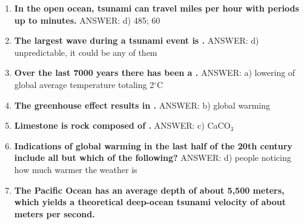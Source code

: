 \documentclass[10pt]{article}
\newcommand{\Rivpt}{\rule{.1pt}{1pt}}
\begin{document}
\begin{enumerate}
\item {
\setlength{\itemsep}{0cm}
\setlength{\parskip}{.2cm}
\begin{samepage}
\textbf{
In the open ocean, tsunami can travel \makebox[1cm]{\Rivpt\hrulefill\Rivpt} miles per hour with periods up to \makebox[1cm]{\Rivpt\hrulefill\Rivpt} minutes.
}
ANSWER: d)	485; 60
\end{samepage}
}
\item {
\setlength{\itemsep}{0cm}
\setlength{\parskip}{.2cm}
\begin{samepage}
\textbf{
The largest wave during a tsunami event is \makebox[1cm]{\Rivpt\hrulefill\Rivpt}.
}
ANSWER: d)	unpredictable, it could be any of them
\end{samepage}
}
\item {
\setlength{\itemsep}{0cm}
\setlength{\parskip}{.2cm}
\begin{samepage}
\textbf{
Over the last 7000 years there has been a \makebox[1cm]{\Rivpt\hrulefill\Rivpt}.
}
ANSWER: a) lowering of global average temperature totaling 2\ensuremath{^\circ}C
\end{samepage}
}
\item {
\setlength{\itemsep}{0cm}
\setlength{\parskip}{.2cm}
\begin{samepage}
\textbf{
The greenhouse effect results in \makebox[1cm]{\Rivpt\hrulefill\Rivpt}.
}
ANSWER: b) global warming
\end{samepage}
}
\item {
\setlength{\itemsep}{0cm}
\setlength{\parskip}{.2cm}
\begin{samepage}
\textbf{
Limestone is rock composed of \makebox[1cm]{\Rivpt\hrulefill\Rivpt}. 
}
ANSWER: c) CaCO\ensuremath{_3}
\end{samepage}
}
\item {
\setlength{\itemsep}{0cm}
\setlength{\parskip}{.2cm}
\begin{samepage}
\textbf{
Indications of global warming in the last half of the 20th century include all but which of the following?
}
ANSWER: d) people noticing how much warmer the weather is
\end{samepage}
}
\item {
\setlength{\itemsep}{0cm}
\setlength{\parskip}{.2cm}
\begin{samepage}
\textbf{
The Pacific Ocean has an average depth of about 5,500 meters, which yields a theoretical deep-ocean tsunami velocity of about \makebox[1cm]{\Rivpt\hrulefill\Rivpt} meters per second.
}

\end{samepage}}
\end{enumerate}
\end{document}
